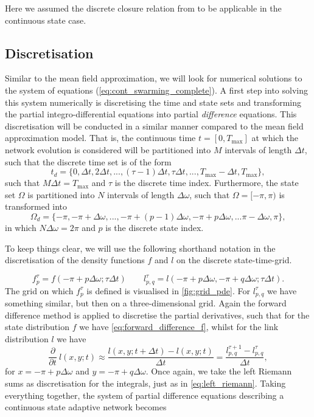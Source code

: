 \normalsize Here we assumed the discrete closure relation from \cite{Chen2016} to be applicable in the continuous state case. 
\normalfont

\subsection{Discretisation}
Similar to the mean field approximation, we will look for numerical solutions to the system of equations (\ref{eq:cont_swarming_complete}). A first step into solving this system numerically is discretising the time and state sets and transforming the partial integro-differential equations into partial \textit{difference} equations. This discretisation will be conducted in a similar manner compared to the mean field approximation model. That is, the continuous time $t = [0, T_{\text{max}}]$ at which the network evolution is considered will be partitioned into $M$ intervals of length $\Delta t$, such that the discrete time set is of the form 
\[ t_d= \{0, \Delta t, 2 \Delta t, ... , (\tau-1) \Delta t,  \tau\Delta t, ..., T_{\text{max}} - \Delta t, T_{\text{max}}  \}, \]
such that $M \Delta t = T_{\text{max}}$ and $\tau$ is the discrete time index. Furthermore, the state set $\Omega$ is partitioned into $N$ intervals of length $\Delta \omega$, such that $\Omega = [-\pi,\pi)$ is transformed into 
\[\Omega_d = \{-\pi, -\pi+\Delta\omega,...,-\pi+ (p-1) \Delta\omega, -\pi+ p \Delta\omega, ... \pi-\Delta\omega, \pi \}, \]
in which $N \Delta \omega = 2\pi$ and $p$ is the discrete state index.

To keep things clear, we will use the following shorthand notation in the discretisation of the density functions $f$ and $l$ on the discrete state-time-grid. 

\begin{equation}
f_{p}^{\tau } = f(-\pi+p\Delta \omega; \tau \Delta t) \qquad l_{p,q}^{\tau }=l(-\pi+p\Delta\omega,-\pi+q\Delta\omega;\tau \Delta t).
\end{equation}
The grid on which $f_{p}^{\tau}$ is defined is visualised in \cref{fig:grid_pde}. For $l_{p,q}^\tau$ we have something similar, but then on a three-dimensional grid. Again the forward difference method is applied to discretise the partial derivatives, such that for the state distribution $f$ we have \cref{eq:forward_difference_f}, whilst for the link distribution $l$ we have
\begin{equation}
\frac{\partial}{\partial t}\ l(x,y;t) \approx \frac{l(x,y;t+\Delta t) - l(x,y;t)}{\Delta t} = \frac{l_{p,q}^{\tau+1} - l_{p,q}^{\tau}}{\Delta t},
\end{equation}
for $x = -\pi + p \Delta \omega $ and $y = -\pi + q \Delta \omega $. Once again, we take the left Riemann sums as discretisation for the integrals, just as in \cref{eq:left_riemann}. Taking everything together, the system of partial difference equations describing a continuous state adaptive network becomes

